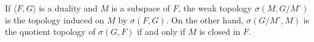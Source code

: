 If $\langle F, G \rangle$ is a duality and $M$ is a subspace of $F$, the weak topology $\sigma(M, G/M^\circ)$ is the topology induced on $M$ by $\sigma(F, G)$. On the other hand, $\sigma(G/M^\circ, M)$ is the quotient topology of $\sigma(G, F)$ if and only if $M$ is closed in $F$.
